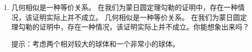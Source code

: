 \begin{enumerate}
    \item 
    几何相似是一种等价关系。 在我们为蒙日圆定理勾勒的证明中，存在一种情况，该证明实际上并不成立。 几何相似是一种等价关系。 在我们为蒙日圆定理勾勒的证明中，存在一种情况，该证明实际上并不成立。你能想象出来吗？
    
    提示：考虑两个相对较大的球体和一个非常小的球体。
    \end{enumerate}
    
    
    
